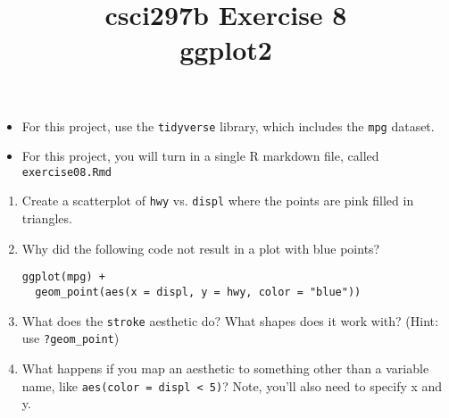 \documentclass[12pt]{article}
\title{csci297b Exercise 8\\ggplot2
  }
\date{}
\newcommand{\bi}{\begin{itemize}}
\newcommand{\ei}{\end{itemize}}
\newcommand{\li}{\item}
\begin{document}
\maketitle

\bi
\li
For this project, use the {\tt tidyverse} library, which includes the {\tt mpg} dataset.
\li
For this project, you will turn in a single R markdown file, called \verb|exercise08.Rmd|

\ei
\begin{enumerate}

\item Create a scatterplot of \verb|hwy| vs. \verb|displ| where the points are pink filled in triangles.

\item Why did the following code not result in a plot with blue points?
\begin{verbatim}
ggplot(mpg) + 
  geom_point(aes(x = displ, y = hwy, color = "blue"))
\end{verbatim}
\item
What does the \verb|stroke| aesthetic do? What shapes does it work with? (Hint: use \verb|?geom_point|)
\item
What happens if you map an aesthetic to something other than a variable name, like 
\verb|aes(color = displ < 5)|? Note, you’ll also need to specify x and y.
\end{enumerate}
\end{document}

